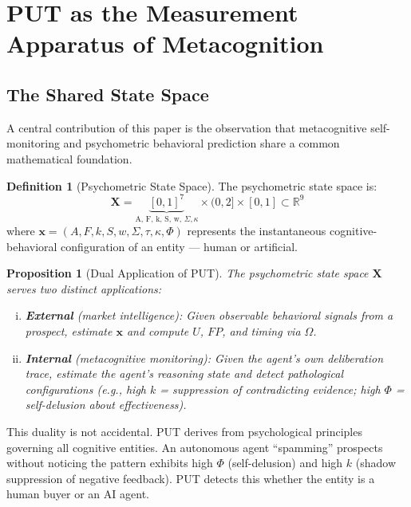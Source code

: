 \documentclass[12pt,a4paper]{article}
\theoremstyle{plain}
\newtheorem{proposition}[theorem]{Proposition}
\theoremstyle{definition}
\newtheorem{definition}[theorem]{Definition}
\theoremstyle{remark}
\begin{document}
\section{PUT as the Measurement Apparatus of Metacognition}
\label{sec:put}

\subsection{The Shared State Space}

A central contribution of this paper is the observation that metacognitive self-monitoring and psychometric behavioral prediction share a common mathematical foundation.

\begin{definition}[Psychometric State Space]
The psychometric state space is:
\[
\mathbf{X} = \underbrace{[0,1]^7}_{\text{A, F, k, S, w, } \Sigma, \kappa} \times (0, 2] \times [0, 1] \subset \mathbb{R}^9
\]
where $\mathbf{x} = (A, F, k, S, w, \Sigma, \tau, \kappa, \Phi)$ represents the instantaneous cognitive-behavioral configuration of an entity --- human or artificial.
\end{definition}

\begin{proposition}[Dual Application of PUT]
\label{prop:dual}
The psychometric state space $\mathbf{X}$ serves two distinct applications:
\begin{enumerate}[(i),nosep]
\item \textbf{External} (market intelligence): Given observable behavioral signals from a prospect, estimate $\mathbf{x}$ and compute $U$, $FP$, and timing via $\Omega$.
\item \textbf{Internal} (metacognitive monitoring): Given the agent's own deliberation trace, estimate the agent's reasoning state and detect pathological configurations (e.g., high $k$ = suppression of contradicting evidence; high $\Phi$ = self-delusion about effectiveness).
\end{enumerate}
\end{proposition}

This duality is not accidental. PUT derives from psychological principles governing all cognitive entities. An autonomous agent ``spamming'' prospects without noticing the pattern exhibits high $\Phi$ (self-delusion) and high $k$ (shadow suppression of negative feedback). PUT detects this whether the entity is a human buyer or an AI agent.
\end{document}
